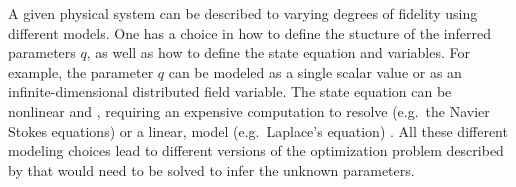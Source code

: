 A given physical system can be described to varying degrees of fidelity using different models. One has a choice in how to define the stucture of the inferred parameters $q$, as well as how to define the state equation and variables. For example, the parameter $q$ can be modeled as a single scalar value or as an infinite-dimensional distributed field variable. The state equation can be nonlinear and , requiring an expensive computation to resolve (e.g.\ the Navier Stokes equations) or a linear,  model (e.g.\ Laplace's equation) . All these different modeling choices lead to different versions of the optimization problem described by  that would need to be solved to infer the unknown parameters.


